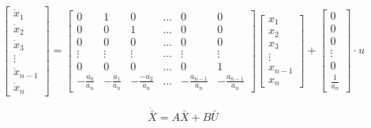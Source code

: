 \begin{enumerate}
		\[\begin{bmatrix} \dot x_1 \\ \dot x_2 \\ \dot x_3 \\ \vdots \\ \dot x_{n-1}
		\\ \dot x_n \end{bmatrix} = 
		\begin{bmatrix} 0 & 1 & 0 & \hdots & 0 & 0 \\
										0 & 0 & 1 & \hdots & 0 & 0 \\
										0 & 0 & 0 & \hdots & 0 & 0 \\
										\vdots & \vdots & \vdots & \hdots & \vdots & \vdots \\
										0 & 0 & 0 & \hdots & 0 & 1\\
										-\frac{a_0}{a_n} & -\frac{a_1}{a_n} & -\frac{-a_2}{a_n} &
										\hdots & -\frac{a_{n-1}}{a_n} & -\frac{a_{n-1}}{a_n} 
										\end{bmatrix}	\begin{bmatrix} 
		x_1 \\ x_2 \\ x_3 \\ \vdots \\ x_{n-1} \\ x_n
										\end{bmatrix} + \begin{bmatrix}
									0 \\ 0 \\ 0 \\ \vdots \\ 0 \\ \frac{1}{a_n} 
									\end{bmatrix} \cdot u
		\]

		\[\dot{\bar X} = A \bar X + B \bar U\]


\end{enumerate}
